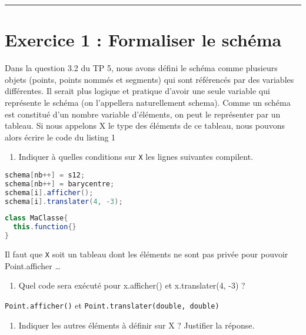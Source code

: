 \documentclass[
]{article}
\newcommand{\passthrough}[1]{#1}
\providecommand{\tightlist}{%
  \setlength{\itemsep}{0pt}\setlength{\parskip}{0pt}}
\begin{document}
\begin{center}\rule{0.5\linewidth}{0.5pt}\end{center}

\clearpage

\hypertarget{exercice-1-formaliser-le-schuxe9ma}{%
\section{Exercice 1 : Formaliser le
schéma}\label{exercice-1-formaliser-le-schuxe9ma}}

Dans la question 3.2 du TP 5, nous avons défini le schéma comme
plusieurs objets (points, points nommés et segments) qui sont référencés
par des variables différentes. Il serait plus logique et pratique
d'avoir une seule variable qui représente le schéma (on l'appellera
naturellement schema). Comme un schéma est constitué d'un nombre
variable d'éléments, on peut le représenter par un tableau. Si nous
appelons X le type des éléments de ce tableau, nous pouvons alors écrire
le code du listing 1

\begin{enumerate}
\def\labelenumi{\arabic{enumi}.}
\tightlist
\item
  Indiquer à quelles conditions sur \passthrough{\lstinline!X!} les
  lignes suivantes compilent.
\end{enumerate}

\begin{lstlisting}[language=Java]
schema[nb++] = s12;
schema[nb++] = barycentre;
schema[i].afficher();
schema[i].translater(4, -3);
\end{lstlisting}

\begin{lstlisting}[frame=single, language=Java]
class MaClasse{
  this.function{}
}
\end{lstlisting}

Il faut que \passthrough{\lstinline!X!} soit un tableau dont les
éléments ne sont pas privée pour pouvoir Point.afficher \ldots{}

\begin{enumerate}
\def\labelenumi{\arabic{enumi}.}
\setcounter{enumi}{1}
\tightlist
\item
  Quel code sera exécuté pour x.afficher() et x.translater(4, -3) ?
\end{enumerate}

\passthrough{\lstinline!Point.afficher()!} et
\passthrough{\lstinline!Point.translater(double, double)!}

\begin{enumerate}
\def\labelenumi{\arabic{enumi}.}
\setcounter{enumi}{2}
\tightlist
\item
  Indiquer les autres éléments à définir sur X ? Justifier la réponse.
\end{enumerate}
\end{document}
